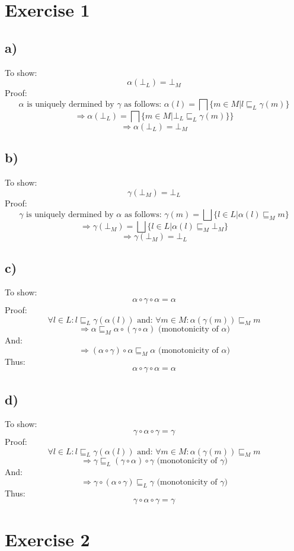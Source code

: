 \documentclass[fleqn,12pt]{article}
\begin{document}
\section*{Exercise 1}
\subsection*{a)}
To show:
$$\alpha(\bot_L) = \bot_M$$
Proof:
$$\alpha \text{ is uniquely dermined by $\gamma$ as follows: } \alpha(l) = \bigsqcap \{m \in M | l \sqsubseteq_L \gamma(m)\}$$
$$\Rightarrow  \alpha(\bot_L) = \bigsqcap \{m \in M | \bot_L \sqsubseteq_L \gamma(m) \}\}$$
$$\Rightarrow \alpha(\bot_L) = \bot_M$$

\subsection*{b)}
To show:
$$\gamma(\bot_M) = \bot_L$$
Proof:
$$\gamma \text{ is uniquely dermined by $\alpha$ as follows: } \gamma(m) = \bigsqcup \{l \in L | \alpha(l) \sqsubseteq_M m\}$$
$$\Rightarrow \gamma(\bot_M) = \bigsqcup \{l \in L | \alpha(l) \sqsubseteq_M \bot_M\} $$
$$\Rightarrow \gamma(\bot_M) = \bot_L$$

\subsection*{c)}
To show:
$$\alpha \circ \gamma \circ \alpha = \alpha$$
Proof:
$$\forall l \in L: l \sqsubseteq_{L} \gamma(\alpha(l)) \text{ and: } \forall m \in M: \alpha(\gamma(m)) \sqsubseteq_{M} m$$
$$\Rightarrow \alpha \sqsubseteq_M \alpha \circ (\gamma \circ \alpha) \text{ (monotonicity of $\alpha$)}$$
And:
$$\Rightarrow (\alpha \circ \gamma) \circ \alpha \sqsubseteq_M \alpha \text{ (monotonicity of $\alpha$)}$$
Thus:
$$\alpha \circ \gamma \circ \alpha = \alpha$$
\subsection*{d)}
To show:
$$\gamma \circ \alpha \circ \gamma = \gamma$$
Proof:
$$\forall l \in L: l \sqsubseteq_{L} \gamma(\alpha(l)) \text{ and: } \forall m \in M: \alpha(\gamma(m)) \sqsubseteq_{M} m$$
$$\Rightarrow \gamma \sqsubseteq_L (\gamma \circ \alpha) \circ \gamma \text{ (monotonicity of $\gamma$)}$$
And:
$$\Rightarrow \gamma \circ (\alpha \circ \gamma) \sqsubseteq_L \gamma \text{ (monotonicity of $\gamma$)}$$
Thus:
$$\gamma \circ \alpha \circ \gamma = \gamma$$
\section*{Exercise 2}
\end{document}
